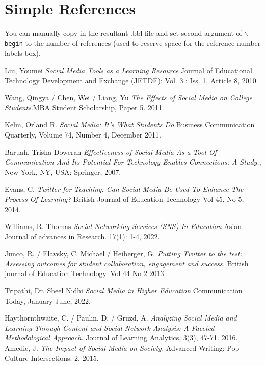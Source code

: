 \documentclass[lettersize,journal]{IEEEtran}
\begin{document}
\section{Simple References}
You can manually copy in the resultant .bbl file and set second argument of $\backslash${\tt{begin}} to the number of references
 (used to reserve space for the reference number labels box).

\begin{thebibliography}{}


	    Liu, Youmei {\it{Social Media Tools as a Learning Resource}} Journal of Educational Technology Development and Exchange (JETDE): Vol. 3 : Iss. 1, Article 8, 2010

        Wang, Qingya / Chen, Wei / Liang, Yu {\it{The Effects of Social Media on College Students}}.MBA Student Scholarship, Paper 5. 2011.

	Kelm, Orland R. {\it{Social Media: It's What Students Do.}}Business Communication Quarterly, Volume 74, Number 4, December 2011.

    Baruah, Trisha Dowerah {\it{Effectiveness of Social Media As a Tool Of Communication And Its Potential For Technology Enables Connections: A Study.}}, New York, NY, USA: Springer, 2007.

	    Evans, C. {\it{Twitter for Teaching: Can Social Media Be Used To Enhance The Process Of Learning?}} British Journal of Education Technology
Vol 45, No 5, 2014.

        Williams, R. Thomas {\it{Social Networking Services (SNS) In Education}}
        Asian Journal of advances in Research. 17(1): 1-4, 2022.

        Junco, R. / Elavsky, C. Michael / Heiberger, G. {\it{Putting Twitter to
        the test: Assessing outcomes for student collaboration, engagement and
        success.}} British journal of Education Technology. Vol 44 No 2 2013

        Tripathi, Dr. Sheel Nidhi {\it{Social Media in Higher Education}}
        Communication Today, January-June, 2022.

    Haythornthwaite, C. / Paulin, D. / Gruzd, A. {\it{Analyzing Social Media
        and Learning Through Content and Social Network Analysis: A Faceted
        Methodological Approach.}} Journal of Learning Analytics, 3(3), 47-71.
        2016.
        Amedie, J. {\it{The Impact of Social Media on Society.}}
        Advanced Writing: Pop Culture Intersections. 2.
        2015.
\end{thebibliography}
\end{document}
